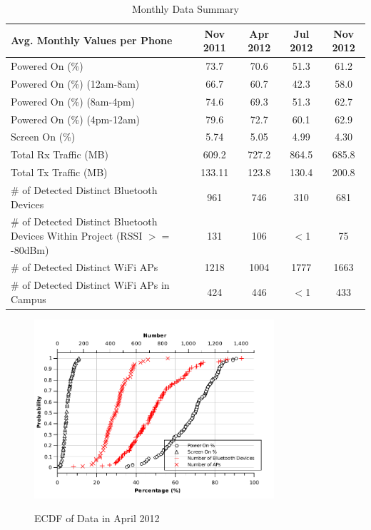 \begin{table}[tb] 
\caption{Monthly Data Summary} 
\centering
\begin{tabular}{p{6cm}|c|c|c|c}
\hline
		  Avg. Monthly Values per Phone							& Nov 2011 & Apr 2012 & Jul 2012 & Nov 2012 \\ [0.5ex] 
\hline\hline Powered On (\%) 										& 73.7 	   & 70.6 	      & 51.3 	& 61.2		\\ 
\hline	  Powered On (\%) (12am-8am) 							&  66.7	    & 60.7 		& 42.3 	& 58.0 \\
\hline 	  Powered On (\%) (8am-4pm) 								& 74.6 	   & 69.3 	      & 51.3 	& 62.7 \\
\hline 	  Powered On (\%) (4pm-12am)   			 				& 79.6	    & 72.7 		& 60.1 	& 62.9 \\
\hline	  Screen On (\%)										&  5.74	    & 5.05 		& 4.99 	& 4.30 \\
\hline	  Total Rx Traffic  (MB)									&  609.2	    & 727.2 	& 864.5 	& 685.8 \\
\hline	  Total Tx Traffic  (MB)									&  133.11	    & 123.8 	& 130.4 	& 200.8 \\
\hline 	  \# of Detected Distinct Bluetooth Devices					&  961 	     & 746 		& 310 	& 681	 \\
\hline 	  \# of Detected Distinct Bluetooth Devices Within Project (RSSI $>=$ -80dBm) 	&  131 	     & 106 		 & 	$<$1 & 75	 \\
\hline	  \# of Detected Distinct WiFi APs 										&  1218 	     & 1004	 	& 1777 	& 1663 \\
\hline	  \# of Detected Distinct WiFi APs in Campus 								&  424 	     & 446	 	& $<$1 	& 433 \\
\hline
\end{tabular}
\label{table:summary} 
\end{table}

\begin{figure}[tbp]
\centering 
{\includegraphics[width=3.5in]{graphs/num_cdf.pdf}}
\caption{ECDF of Data in April 2012} 
\label{fig:num_cdf}
\end{figure} 

